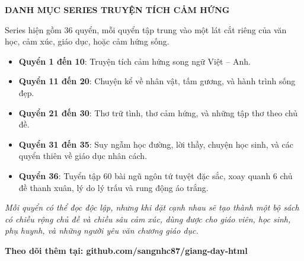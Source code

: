 \thispagestyle{empty}
\vspace*{2cm}

\begin{center}
{\Large\bfseries\color{titlecolor} DANH MỤC SERIES TRUYỆN TÍCH CẢM HỨNG\par}
\end{center}

\vspace{1.2cm}

Series hiện gồm 36 quyển, mỗi quyển tập trung vào một lát cắt riêng của văn học, cảm xúc, giáo dục, hoặc cảm hứng sống.

\vspace{0.8cm}

\begin{itemize}[label={\color{titlecolor}\textbullet}, itemsep=0.55cm]
  \item \textbf{Quyển 1 đến 10}: Truyện tích cảm hứng song ngữ Việt -- Anh.
  \item \textbf{Quyển 11 đến 20}: Chuyện kể về nhân vật, tấm gương, và hành trình sống đẹp.
  \item \textbf{Quyển 21 đến 30}: Thơ trữ tình, thơ cảm hứng, và những tập thơ theo chủ đề.
  \item \textbf{Quyển 31 đến 35}: Suy ngẫm học đường, lời thầy, chuyện học sinh, và các quyển thiên về giáo dục nhân cách.
  \item \textbf{Quyển 36}: Tuyển tập 60 bài ngũ ngôn tứ tuyệt đặc sắc, xoay quanh 6 chủ đề thanh xuân, lý do lý trấu và rung động áo trắng.
\end{itemize}

\vspace{1.2cm}

\small\itshape
Mỗi quyển có thể đọc độc lập, nhưng khi đặt cạnh nhau sẽ tạo thành một bộ sách có chiều rộng chủ đề và chiều sâu cảm xúc, dùng được cho giáo viên, học sinh, phụ huynh, và những người yêu văn chương giáo dục.

\vfill
\small\bfseries\color{titlecolor}
Theo dõi thêm tại: github.com/sangnhc87/giang-day-html

\clearpage
